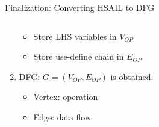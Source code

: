 \documentclass[handout]{beamer}
\begin{document}
\begin{CJK}{UTF8}{bkai}
\begin{frame}{Finalization: Converting HSAIL to DFG}
\begin{columns}
\begin{column}{0.6\textwidth}
\begin{enumerate}
{                                \begin{itemize}
                                    \item Store LHS variables in $V_{OP}$
                                    \item Store use-define chain in $E_{OP}$
                                \end{itemize}
                            }
                        \item <5->{DFG: $G = (V_{OP}, E_{OP})$ is obtained.
                                \begin{itemize}
                                    \item Vertex: operation
                                    \item Edge: data flow
                                \end{itemize}
                            }
                        \end{enumerate}
                    \end{column}
                \end{columns}
                \vspace{-1em}
            \end{frame}


\end{CJK}
\end{document}
